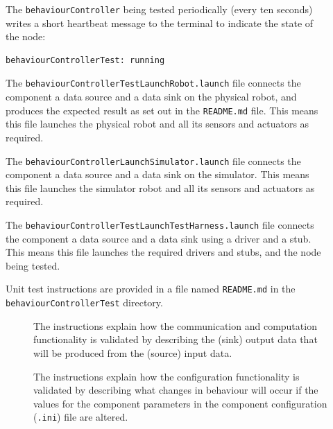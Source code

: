 \documentclass{CSSRforAfrica}
\newcommand{\checkboxChecked}{\fbox{\ding{51}}} %
\newcommand{\checkboxDashed}{\fbox{--}}         %
\begin{document}
\begin{description}
\item[\checkboxChecked]  The {\small \verb+behaviourController+} being tested periodically (every ten seconds) writes a short heartbeat message to
 the terminal to indicate the state of the node:
\begin{verbatim}
behaviourControllerTest: running
\end{verbatim}

\item[\checkboxChecked] The {\small \verb+behaviourControllerTestLaunchRobot.launch+} file  connects the component a data source and a data sink on the physical robot, and produces the expected result as set out in the  {\small \verb+README.md+}  file.    This means this file launches the physical robot and all its sensors and actuators as required.

\item[\checkboxDashed] The {\small \verb+behaviourControllerLaunchSimulator.launch+} file  connects the component a data source and a data sink on the simulator.   This means this file launches the simulator robot and all its sensors and actuators as required.

\item[\checkboxChecked] The {\small \verb+behaviourControllerTestLaunchTestHarness.launch+} file  connects the component a data source and a data sink using a driver and a stub.   This means this file launches the required drivers and stubs, and the node being tested.

\item[\checkboxChecked] Unit test instructions are provided in a file named {\small \verb+README.md+} in the  {\small \verb+behaviourControllerTest+} directory. 


\begin{description}

\item[\checkboxChecked] The instructions explain how the communication and computation functionality is validated by describing the (sink) output data that will be produced from the (source) input data.  

\item[\checkboxChecked] The instructions explain how the configuration functionality is validated by describing what changes in behaviour will occur if the values for the component parameters in the component configuration ({\small \verb+.ini+}) file are altered.

\end{description}
\end{description}
\newpage
\end{document}
